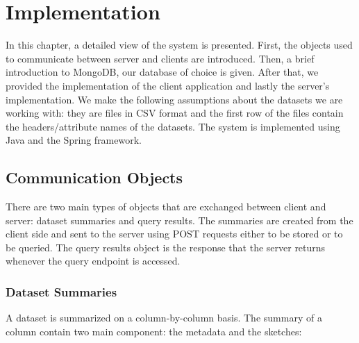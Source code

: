 


\chapter{Implementation}
\label{chap:implementation}
\pagestyle{plain}

In this chapter, a detailed view of the system is presented. First, the objects used to communicate between server and clients are introduced. Then, a brief introduction to MongoDB, our database of choice is given. After that, we provided the implementation of the client application and lastly the server's implementation. We make the following assumptions about the datasets we are working with: they are files in CSV format and the first row of the files contain the headers/attribute names of the datasets. The system is implemented using Java and the Spring framework.

\section{Communication Objects}

There are two main types of objects that are exchanged between client and server: dataset summaries and query results. The summaries are created from the client side and sent to the server using POST requests either to be stored or to be queried. The query results object is the response that the server returns whenever the query endpoint is accessed.

\subsection{Dataset Summaries}\label{metadata}

A dataset is summarized on a column-by-column basis. The summary of a column contain two main component: the metadata and the sketches:


